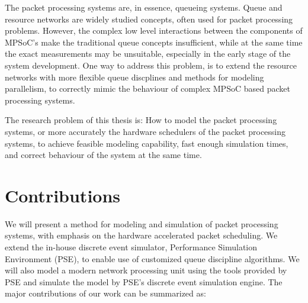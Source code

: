 
The packet processing systems are, in essence, queueing systems. Queue and resource networks are widely studied concepts, often used for packet processing problems. However, the complex low level interactions between the components of MPSoC's make the traditional queue concepts insufficient, while at the same time the exact measurements may be unsuitable, especially in the early stage of the system development. One way to address this problem, is to extend the resource networks with more flexible queue discplines and methods for modeling parallelism, to correctly mimic the behaviour of complex MPSoC based packet processing systems.

The research problem of this thesis is: How to model the packet processing systems, or more accurately the hardware schedulers of the packet processing systems, to achieve feasible modeling capability, fast enough simulation times, and correct behaviour of the system at the same time.

\section{Contributions}
We will present a method for modeling and simulation of packet processing systems, with emphasis on the hardware accelerated packet scheduling. We extend the in-house discrete event simulator, Performance Simulation Environment (PSE), to enable use of customized queue discipline algorithms. We will also model a modern network processing unit using the tools provided by PSE and simulate the model by PSE's discrete event simulation engine. The major contributions of our work can be summarized as:




